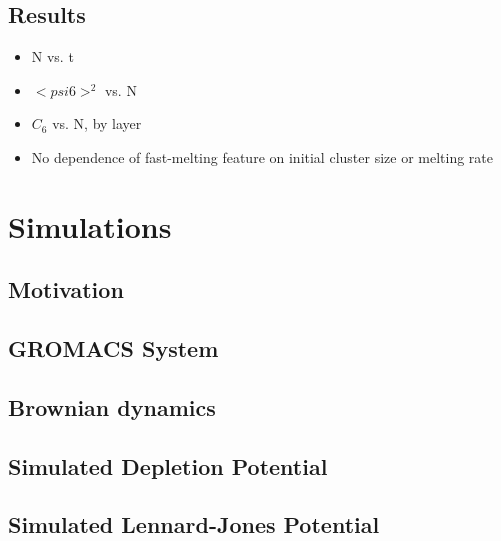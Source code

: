 \documentclass{umthesis}
\begin{document}
\subsection{Results}
\label{sec-1.2.3}
\begin{itemize}

\item N vs. t\\
\label{sec-1.2.3.1}%
\item $< psi6 >^2$ vs. N\\
\label{sec-1.2.3.2}%
\item $C_6$ vs. N, by layer\\
\label{sec-1.2.3.3}%
\item No dependence of fast-melting feature on initial cluster size or melting rate\\
\label{sec-1.2.3.4}%
\end{itemize} %
\section{Simulations}
\label{sec-1.3}
\subsection{Motivation}
\label{sec-1.3.1}
\subsection{GROMACS System}
\label{sec-1.3.2}
\subsection{Brownian dynamics}
\label{sec-1.3.3}
\subsection{Simulated Depletion Potential}
\label{sec-1.3.4}
\subsection{Simulated Lennard-Jones Potential}
\label{sec-1.3.5}
\end{document}

